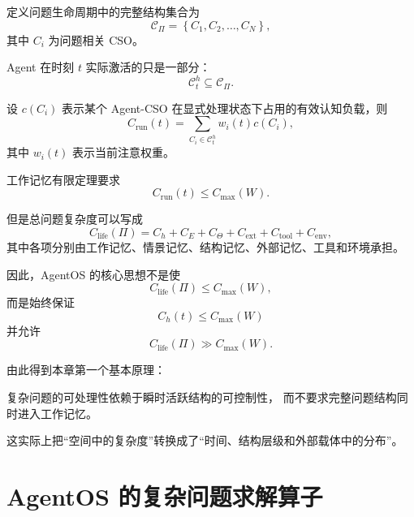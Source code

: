 定义问题生命周期中的完整结构集合为
\begin{equation}
\mathcal C_\Pi
=
\left\{
C_1,
C_2,
\ldots,
C_N
\right\},
\end{equation}
其中 $C_i$ 为问题相关 CSO。

Agent 在时刻 $t$ 实际激活的只是一部分：
\begin{equation}
\mathcal C_t^{h}
\subseteq
\mathcal C_\Pi.
\end{equation}

设 $c(C_i)$ 表示某个 Agent-CSO 在显式处理状态下占用的有效认知负载，则
\begin{equation}
C_{\mathrm{run}}(t)
=
\sum_{C_i\in\mathcal C_t^{h}}
w_i(t)c(C_i),
\end{equation}
其中 $w_i(t)$ 表示当前注意权重。

工作记忆有限定理要求
\begin{equation}
C_{\mathrm{run}}(t)
\leq
C_{\max}(W).
\end{equation}

但是总问题复杂度可以写成
\begin{equation}
C_{\mathrm{life}}(\Pi)
=
C_h
+
C_E
+
C_\Theta
+
C_{\mathrm{ext}}
+
C_{\mathrm{tool}}
+
C_{\mathrm{env}},
\end{equation}
其中各项分别由工作记忆、情景记忆、结构记忆、外部记忆、工具和环境承担。

因此，AgentOS 的核心思想不是使
\begin{equation}
C_{\mathrm{life}}(\Pi)
\leq
C_{\max}(W),
\end{equation}
而是始终保证
\begin{equation}
\boxed{
C_h(t)
\leq
C_{\max}(W)
}
\end{equation}
并允许
\begin{equation}
C_{\mathrm{life}}(\Pi)
\gg
C_{\max}(W).
\end{equation}

由此得到本章第一个基本原理：

\begin{statementbox}
复杂问题的可处理性依赖于瞬时活跃结构的可控制性，
而不要求完整问题结构同时进入工作记忆。
\end{statementbox}

这实际上把“空间中的复杂度”转换成了“时间、结构层级和外部载体中的分布”。

\section{AgentOS 的复杂问题求解算子}

